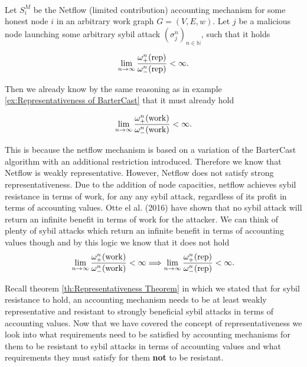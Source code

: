 \begin{example}\ \\
\label{ex:Representativeness of NetFlow}
\noindent{}Let $S^M_i$ be the Netflow (limited contribution) accounting mechanism \cite{Sybil-resistant Trust Mechanisms in Distributed Systems} for some honest node $i$ in an arbitrary work graph $G=(V,E,w)$. Let $j$ be a malicious node launching some arbitrary sybil attack $(\sigma^n_j)_{n\in\mathbb{N}}$, such that it holds

\[
\lim\limits_{n\rightarrow\infty}\frac{\omega^n_{+}({\rm rep})}{\omega^n_{-}({\rm rep})} < \infty.
\]

\noindent{}Then we already know by the same reasoning as in example \ref{ex:Representativeness of BarterCast} that it must already hold

\[
\lim\limits_{n\rightarrow\infty}\frac{\omega^n_{+}({\rm work})}{\omega^n_{-}({\rm work})} < \infty.
\]

\noindent{}This is because the netflow mechanism is based on a variation of the BarterCast algorithm with an additional restriction introduced. Therefore we know that Netflow is weakly representative. However, Netflow does not satisfy strong representativeness. Due to the addition of node capacities, netflow achieves sybil resistance in terms of work, for any any sybil attack, regardless of its profit in terms of accounting values. Otte el al. (2016) have shown that no sybil attack will return an infinite benefit in terms of work for the attacker. We can think of plenty of sybil attacks which return an infinite benefit in terms of accounting values though and by this logic we know that it does not hold
\[
\lim\limits_{n\rightarrow\infty}\frac{\omega^n_{+}({\rm work})}{\omega^n_{-}({\rm work})} < \infty \Longrightarrow \lim\limits_{n\rightarrow\infty}\frac{\omega^n_{+}({\rm rep})}{\omega^n_{-}({\rm rep})} < \infty.
\]
\end{example}

\noindent{}Recall theorem \ref{th:Representativeness Theorem} in which we stated that for sybil resistance to hold, an accounting mechanism needs to be at least weakly representative and resistant to strongly beneficial sybil attacks in terms of accounting values. Now that we have covered the concept of representativeness we look into what requirements need to be satisfied by accounting mechanisms for them to be resistant to sybil attacks in terms of accounting values and what requirements they must satisfy for them \textbf{not} to be resistant. 
